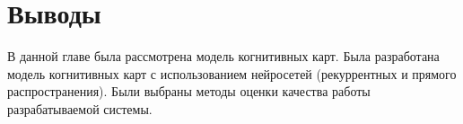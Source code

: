 




\section{Выводы}

В данной главе была рассмотрена модель когнитивных карт.
Была разработана модель когнитивных карт
с использованием нейросетей (рекуррентных и прямого распространения).
Были выбраны методы оценки качества работы разрабатываемой системы.
